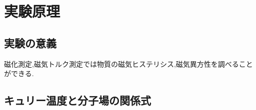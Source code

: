 \section{実験原理}
\subsection{実験の意義}
磁化測定,磁気トルク測定では物質の磁気ヒステリシス,磁気異方性を調べることができる.
\subsection{キュリー温度と分子場の関係式}